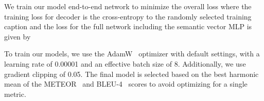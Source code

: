 \documentclass[runningheads,table]{llncs}
\begin{document}
We train our model end-to-end network to minimize the overall loss  where the training loss for decoder is the cross-entropy to the randomly selected training caption and the loss for the full network including the semantic vector MLP is given by 


To train our models, we use the AdamW~\cite{loshchilov2017decoupled} optimizer with default settings, with a learning rate of 0.00001 and an effective batch size of 8. Additionally, we use gradient clipping of 0.05.
The final model is selected based on the best harmonic mean of the METEOR~\cite{banerjee2005meteor} and BLEU-4~\cite{papineni2002bleu} scores to avoid optimizing for a single metric.



 
\end{document}
